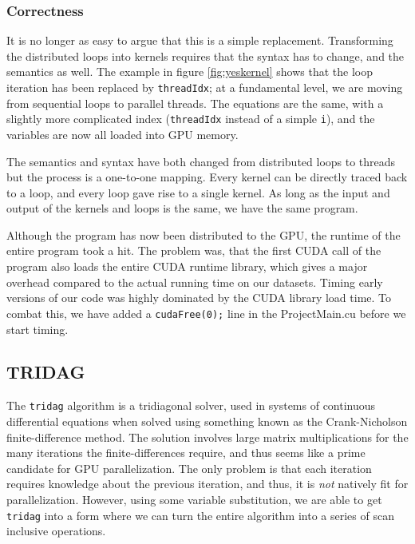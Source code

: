 \documentclass[12pt, oneside]{article}
\begin{document}
\subsubsection{Correctness}
It is no longer as easy to argue that this is a simple replacement. Transforming the distributed loops into kernels requires that the syntax has to change, and the semantics as well. The example in figure \ref{fig:yeskernel} shows that the loop iteration has been replaced by \texttt{threadIdx}; at a fundamental level, we are moving from sequential loops to parallel threads. The equations are the same, with a slightly more complicated index (\texttt{threadIdx} instead of a simple \texttt{i}), and the variables are now all loaded into GPU memory.
						
The semantics and syntax have both changed from distributed loops to threads but the process is a one-to-one mapping. Every kernel can be directly traced back to a loop, and every loop gave rise to a single kernel. As long as the input and output of the kernels and loops is the same, we have the same program.
						
Although the program has now been distributed to the GPU, the runtime of the entire program took a hit. The problem was, that the first CUDA call of the program also loads the entire CUDA runtime library, which gives a major overhead compared to the actual running time on our datasets. Timing early versions of our code was highly dominated by the CUDA library load time. To combat this, we have added a \texttt{cudaFree(0);} line in the ProjectMain.cu before we start timing.
\subsection{TRIDAG}
The \texttt{tridag} algorithm is a tridiagonal solver, used in systems of continuous differential equations when solved using something known as the Crank-Nicholson finite-difference method. The solution involves large matrix multiplications for the many iterations the finite-differences require, and thus seems like a prime candidate for GPU parallelization. The only problem is that each iteration requires knowledge about the previous iteration, and thus, it is \emph{not} natively fit for parallelization. However, using some variable substitution, we are able to get \texttt{tridag} into a form where we can turn the entire algorithm into a series of scan inclusive operations.
\end{document}
